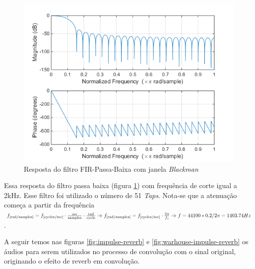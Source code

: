 		\begin{figure}[!ht]
			\label{fig-exp3}
			\centering
			\includegraphics[scale=0.7]{./figuras/simulacoes/resposta-do-filtro-FIR-FPB-2khz.png}
			\caption{Resposta do filtro FIR-Passa-Baixa com janela \textit{Blackman}}
		\end{figure}
	
		Essa resposta do filtro passa baixa (figura \ref{fig-exp3}) com frequência de corte igual a 2kHz. Esse filtro foi utilizado o número de 51 \textit{Taps}. Nota-se que a atenuação começa a partir da frequência $f_{[\rm rad/samples]} = f_{[\rm cycles/sec]}\cdot \frac{\text{sec}}{\text{samples}}\cdot \frac{\text{rad}}{\text{cycle}} \Rightarrow f_{[\rm rad/samples]} = f_{[\rm cycles/sec]}\cdot \frac{2\pi}{f_s}\Rightarrow f = 44100*0.2/2\pi = 1403.74 Hz$.
	
		
		A seguir temos nas figuras \ref{fig:impulse-reverb} e \ref{fig:warhouse-impulse-reverb} os áudios para serem utilizados no processo de convolução com o sinal original, originando o efeito de reverb em convolução.
		
